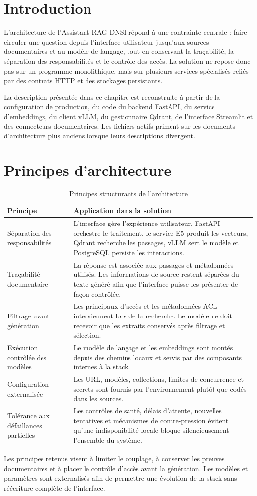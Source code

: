 
\section{Introduction}

L'architecture de l'Assistant RAG DNSI répond à une contrainte centrale : faire circuler une question depuis l'interface utilisateur jusqu'aux sources documentaires et au modèle de langage, tout en conservant la traçabilité, la séparation des responsabilités et le contrôle des accès. La solution ne repose donc pas sur un programme monolithique, mais sur plusieurs services spécialisés reliés par des contrats HTTP et des stockages persistants.

La description présentée dans ce chapitre est reconstruite à partir de la configuration de production, du code du backend FastAPI, du service d'embeddings, du client vLLM, du gestionnaire Qdrant, de l'interface Streamlit et des connecteurs documentaires. Les fichiers actifs priment sur les documents d'architecture plus anciens lorsque leurs descriptions divergent.

\section{Principes d'architecture}

\begin{table}[H]
\centering
\caption{Principes structurants de l'architecture}
\label{tab:principes_architecture_ch5}
\begin{tabular}{p{3.8cm}p{9.3cm}}
\toprule
\textbf{Principe} & \textbf{Application dans la solution} \\
\midrule
Séparation des responsabilités & L’interface gère l’expérience utilisateur, FastAPI orchestre le traitement, le service E5 produit les vecteurs, Qdrant recherche les passages, vLLM sert le modèle et PostgreSQL persiste les interactions. \\
Traçabilité documentaire & La réponse est associée aux passages et métadonnées utilisés. Les informations de source restent séparées du texte généré afin que l’interface puisse les présenter de façon contrôlée. \\
Filtrage avant génération & Les principaux d’accès et les métadonnées ACL interviennent lors de la recherche. Le modèle ne doit recevoir que les extraits conservés après filtrage et sélection. \\
Exécution contrôlée des modèles & Le modèle de langage et les embeddings sont montés depuis des chemins locaux et servis par des composants internes à la stack. \\
Configuration externalisée & Les URL, modèles, collections, limites de concurrence et secrets sont fournis par l’environnement plutôt que codés dans les sources. \\
Tolérance aux défaillances partielles & Les contrôles de santé, délais d’attente, nouvelles tentatives et mécanismes de contre-pression évitent qu’une indisponibilité locale bloque silencieusement l’ensemble du système. \\
\bottomrule
\end{tabular}
\end{table}

Les principes retenus visent à limiter le couplage, à conserver les preuves documentaires et à placer le contrôle d'accès avant la génération. Les modèles et paramètres sont externalisés afin de permettre une évolution de la stack sans réécriture complète de l'interface.
